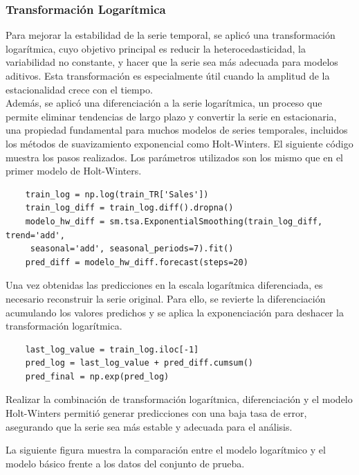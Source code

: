 \subsubsection{Transformación Logarítmica}
Para mejorar la estabilidad de la serie temporal, se aplicó una transformación logarítmica, cuyo objetivo principal es reducir la heterocedasticidad, la variabilidad no constante, y hacer que la serie sea más adecuada para modelos aditivos. Esta transformación es especialmente útil cuando la amplitud de la estacionalidad crece con el tiempo. \\

Además, se aplicó una diferenciación a la serie logarítmica, un proceso que permite eliminar tendencias de largo plazo y convertir la serie en estacionaria, una propiedad fundamental para muchos modelos de series temporales, incluidos los métodos de suavizamiento exponencial como Holt-Winters. El siguiente código muestra los pasos realizados. Los parámetros utilizados son los mismo que en el primer modelo de Holt-Winters.
\begin{lstlisting}
	train_log = np.log(train_TR['Sales'])
	train_log_diff = train_log.diff().dropna()
	modelo_hw_diff = sm.tsa.ExponentialSmoothing(train_log_diff, trend='add',
	 seasonal='add', seasonal_periods=7).fit()
	pred_diff = modelo_hw_diff.forecast(steps=20)
\end{lstlisting}
Una vez obtenidas las predicciones en la escala logarítmica diferenciada, es necesario reconstruir la serie original. Para ello, se revierte la diferenciación acumulando los valores predichos y se aplica la exponenciación para deshacer la transformación logarítmica.
\begin{lstlisting}
	last_log_value = train_log.iloc[-1]  
	pred_log = last_log_value + pred_diff.cumsum()
	pred_final = np.exp(pred_log)
\end{lstlisting}

Realizar la combinación de transformación logarítmica, diferenciación y el modelo Holt-Winters permitió generar predicciones con una baja tasa de error, asegurando que la serie sea más estable y adecuada para el análisis. 

La siguiente figura muestra la comparación entre el modelo logarítmico y el modelo básico frente a los datos del conjunto de prueba.\\

